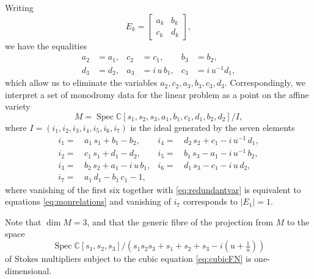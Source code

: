 \documentclass[a4paper,reqno]{amsart}
\numberwithin{equation}{section}
\newcommand{\C}{\mathbb{C}}
\numberwithin{equation}{section}
\begin{document}
Writing
\begin{equation*}
    E_k=\begin{bmatrix}
        a_k & b_k\\
        c_k & d_k
    \end{bmatrix},
\end{equation*}
we have the equalities
\begin{equation}\label{eq:redundantvar}
\begin{aligned}
  a_2&=a_1, & c_2&=c_1, & b_3&=b_2,\\
 d_3&=d_2, & a_3&=i\,u\,b_1, & c_3&=i\,u^{-1}d_1,  
\end{aligned}
\end{equation}
which allow us to eliminate the variables $a_2,c_2,a_3,b_3,c_3,d_3$. Correspondingly, we interpret a set of monodromy data for the linear problem as a point on the affine variety
\begin{equation*}
    M = \operatorname{Spec} \C [s_1,s_2,s_3,a_1,b_1,c_1,d_1,b_2,d_2]/I,
\end{equation*}
where $I = (i_1,i_2,i_3,i_4,i_5,i_6,i_7)$ is the ideal generated by the seven elements
\begin{equation*}
    \begin{aligned}
        i_1=&\,a_1\,s_1+b_1-b_2, & i_4=&\,d_2\,s_2+c_1-i\, u^{-1}\, d_1,\\
        i_2=&\,c_1\,s_1+d_1-d_2, &     i_5=&\,b_1\,s_3-a_1-i\, u^{-1}\, b_2,\\
        i_3=&\,b_2\,s_2+a_1-i\, u\,b_1, & i_6=&\,d_1\,s_3-c_1-i\,u\, d_2,\\
        i_7=&\,a_1\,d_1-b_1\,c_1-1, &&
    \end{aligned}
\end{equation*}
where vanishing of the first six together with \eqref{eq:redundantvar} is equivalent to equations \eqref{eq:monrelations} and vanishing of $i_7$ corresponds to $|E_1|=1$.


Note that $\operatorname{dim}M=3$, and that the generic fibre of the projection from $M$ to the space $$\operatorname{Spec}\C[s_1,s_2,s_3] / (s_1s_2s_3 +s_1+s_2+s_3- i (u+\tfrac{1}{u}))$$ of Stokes multipliers subject to the cubic equation  \eqref{eq:cubicFN} is one-dimensional.
\end{document}
